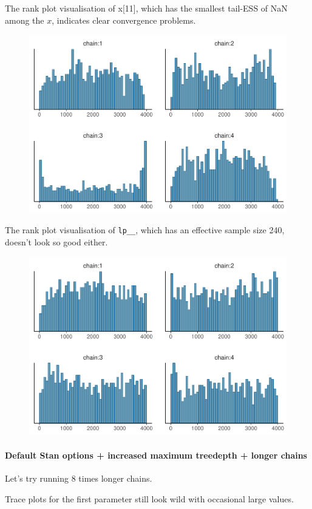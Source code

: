 \documentclass[american,]{article}
\let\oldparagraph\paragraph
\renewcommand{\paragraph}[1]{\oldparagraph{#1}\mbox{}}
\begin{document}
The rank plot visualisation of x{[}11{]}, which has the smallest
tail-ESS of NaN among the \(x\), indicates clear convergence problems.

\begin{figure}[t]
  \centering
  \includegraphics[width=0.6\linewidth]{graphics/hist-fit-nom-td20-1.pdf}
\end{figure}

The rank plot visualisation of \texttt{lp\_\_}, which has an effective
sample size 240, doesn't look so good either.

\begin{figure}[t]
  \centering
  \includegraphics[width=0.6\linewidth]{graphics/hist-fit-nom-td20-lp-1.pdf}
\end{figure}

\hypertarget{default-stan-options-increased-maximum-treedepth-longer-chains}{%
\paragraph{Default Stan options + increased maximum treedepth + longer
chains}\label{default-stan-options-increased-maximum-treedepth-longer-chains}}

Let's try running 8 times longer chains.

Trace plots for the first parameter still look wild with occasional
large values.
\end{document}
